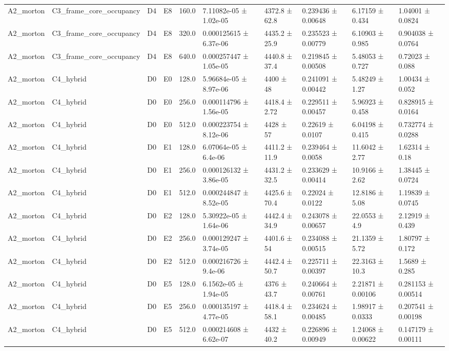 \begin{table}
\begin{tabular}{llllllllll}
A2\_morton & C3\_frame\_core\_occupancy & D4 & E8 & 160.0 & 7.11082e-05 ± 1.02e-05 & 4372.8 ± 62.8 & 0.239436 ± 0.00648 & 6.17159 ± 0.434 & 1.04001 ± 0.0824 \\
A2\_morton & C3\_frame\_core\_occupancy & D4 & E8 & 320.0 & 0.000125615 ± 6.37e-06 & 4435.2 ± 25.9 & 0.235523 ± 0.00779 & 6.10903 ± 0.985 & 0.904038 ± 0.0764 \\
A2\_morton & C3\_frame\_core\_occupancy & D4 & E8 & 640.0 & 0.000257447 ± 1.05e-05 & 4440.8 ± 37.4 & 0.219845 ± 0.00508 & 5.48053 ± 0.727 & 0.72023 ± 0.088 \\
A2\_morton & C4\_hybrid & D0 & E0 & 128.0 & 5.96684e-05 ± 8.97e-06 & 4400 ± 48 & 0.241091 ± 0.00442 & 5.48249 ± 1.27 & 1.00434 ± 0.052 \\
A2\_morton & C4\_hybrid & D0 & E0 & 256.0 & 0.000114796 ± 1.56e-05 & 4418.4 ± 2.72 & 0.229511 ± 0.00457 & 5.96923 ± 0.458 & 0.828915 ± 0.0164 \\
A2\_morton & C4\_hybrid & D0 & E0 & 512.0 & 0.000223754 ± 8.12e-06 & 4428 ± 57 & 0.22619 ± 0.0107 & 6.04198 ± 0.415 & 0.732774 ± 0.0288 \\
A2\_morton & C4\_hybrid & D0 & E1 & 128.0 & 6.07064e-05 ± 6.4e-06 & 4411.2 ± 11.9 & 0.239464 ± 0.0058 & 11.6042 ± 2.77 & 1.62314 ± 0.18 \\
A2\_morton & C4\_hybrid & D0 & E1 & 256.0 & 0.000126132 ± 3.86e-05 & 4431.2 ± 32.5 & 0.233629 ± 0.00414 & 10.9166 ± 2.62 & 1.38445 ± 0.0724 \\
A2\_morton & C4\_hybrid & D0 & E1 & 512.0 & 0.000244847 ± 8.52e-05 & 4425.6 ± 70.4 & 0.22024 ± 0.0122 & 12.8186 ± 5.08 & 1.19839 ± 0.0745 \\
A2\_morton & C4\_hybrid & D0 & E2 & 128.0 & 5.30922e-05 ± 1.64e-06 & 4442.4 ± 34.9 & 0.243078 ± 0.00657 & 22.0553 ± 4.9 & 2.12919 ± 0.439 \\
A2\_morton & C4\_hybrid & D0 & E2 & 256.0 & 0.000129247 ± 3.74e-05 & 4401.6 ± 54 & 0.234088 ± 0.00515 & 21.1359 ± 5.72 & 1.80797 ± 0.172 \\
A2\_morton & C4\_hybrid & D0 & E2 & 512.0 & 0.000216726 ± 9.4e-06 & 4442.4 ± 50.7 & 0.225711 ± 0.00397 & 22.3163 ± 10.3 & 1.5689 ± 0.285 \\
A2\_morton & C4\_hybrid & D0 & E5 & 128.0 & 6.1562e-05 ± 1.94e-05 & 4376 ± 43.7 & 0.240664 ± 0.00761 & 2.21871 ± 0.00106 & 0.281153 ± 0.00514 \\
A2\_morton & C4\_hybrid & D0 & E5 & 256.0 & 0.000135197 ± 4.77e-05 & 4418.4 ± 58.1 & 0.234624 ± 0.00485 & 1.98917 ± 0.0333 & 0.207541 ± 0.00198 \\
A2\_morton & C4\_hybrid & D0 & E5 & 512.0 & 0.000214608 ± 6.62e-07 & 4432 ± 40.2 & 0.226896 ± 0.00949 & 1.24068 ± 0.00622 & 0.147179 ± 0.00111 \\

\end{tabular}
\end{table}
